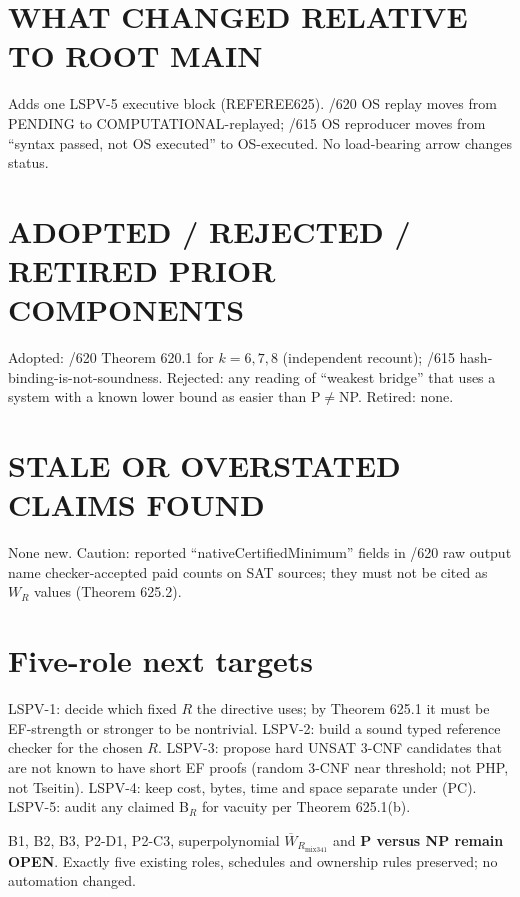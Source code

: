 \documentclass[11pt]{article}
\begin{document}
\section*{WHAT CHANGED RELATIVE TO ROOT MAIN}
Adds one LSPV-5 executive block (REFEREE625). /620 OS replay moves from PENDING to COMPUTATIONAL-replayed; /615 OS reproducer moves from ``syntax passed, not OS executed'' to OS-executed. No load-bearing arrow changes status.

\section*{ADOPTED / REJECTED / RETIRED PRIOR COMPONENTS}
Adopted: /620 Theorem 620.1 for $k=6,7,8$ (independent recount); /615 hash-binding-is-not-soundness. Rejected: any reading of ``weakest bridge'' that uses a system with a known lower bound as easier than P$\ne$NP. Retired: none.

\section*{STALE OR OVERSTATED CLAIMS FOUND}
None new. Caution: reported ``nativeCertifiedMinimum'' fields in /620 raw output name checker-accepted paid counts on SAT sources; they must not be cited as $W_R$ values (Theorem 625.2).

\section*{Five-role next targets}
LSPV-1: decide which fixed $R$ the directive uses; by Theorem 625.1 it must be EF-strength or stronger to be nontrivial. LSPV-2: build a sound typed reference checker for the chosen $R$. LSPV-3: propose hard UNSAT 3-CNF candidates that are not known to have short EF proofs (random 3-CNF near threshold; not PHP, not Tseitin). LSPV-4: keep cost, bytes, time and space separate under \textsf{(PC)}. LSPV-5: audit any claimed B$_R$ for vacuity per Theorem 625.1(b).

\medskip
\noindent B1, B2, B3, P2-D1, P2-C3, superpolynomial $\overline W_{R_{\mathrm{mix341}}}$ and \textbf{P versus NP remain OPEN}. Exactly five existing roles, schedules and ownership rules preserved; no automation changed.
\end{document}
